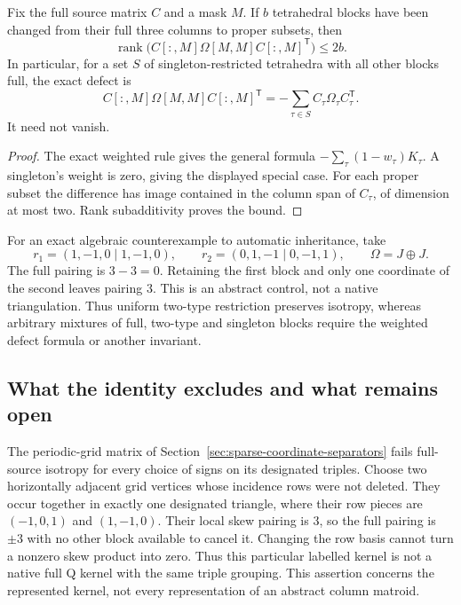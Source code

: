 \begin{proposition}
Fix the full source matrix $C$ and a mask $M$.  If $b$ tetrahedral blocks
have been changed from their full three columns to proper subsets, then
\[
 \operatorname{rank}\bigl(C[:,M]\Omega[M,M]C[:,M]^{\mathsf T}\bigr)\le2b.
\]
In particular, for a set $S$ of singleton-restricted tetrahedra with all
other blocks full, the exact defect is
\[
 C[:,M]\Omega[M,M]C[:,M]^{\mathsf T}
       =-\sum_{\tau\in S}C_\tau\Omega_\tau C_\tau^{\mathsf T}.
\]
It need not vanish.
\end{proposition}
\begin{proof}
The exact weighted rule gives the general formula
$-\sum_\tau(1-w_\tau)K_\tau$.  A singleton's weight is zero, giving the
displayed special case.  For each proper subset the difference has image
contained in the column span of $C_\tau$, of dimension at most two.
Rank subadditivity proves the bound.
\end{proof}

For an exact algebraic counterexample to automatic inheritance, take
\[
 r_1=(1,-1,0\mid1,-1,0),\qquad
 r_2=(0,1,-1\mid0,-1,1),\qquad \Omega=J\oplus J.
\]
The full pairing is $3-3=0$.  Retaining the first block and only one
coordinate of the second leaves pairing $3$.  This is an abstract control,
not a native triangulation.  Thus uniform two-type restriction preserves
isotropy, whereas arbitrary mixtures of full, two-type and singleton
blocks require the weighted defect formula or another invariant.

\subsection{What the identity excludes and what remains open}

The periodic-grid matrix of Section~\ref{sec:sparse-coordinate-separators}
fails full-source isotropy for every choice of signs on its designated
triples.  Choose two horizontally adjacent grid vertices whose incidence
rows were not deleted.  They occur together in exactly one designated
triangle, where their row pieces are $(-1,0,1)$ and $(1,-1,0)$.
Their local skew pairing is $3$, so the full pairing is $\pm3$ with no
other block available to cancel it.  Changing the row basis cannot turn a
nonzero skew product into zero.  Thus this particular labelled kernel is
not a native full Q kernel with the same triple grouping.  This assertion
concerns the represented kernel, not every representation of an abstract
column matroid.

